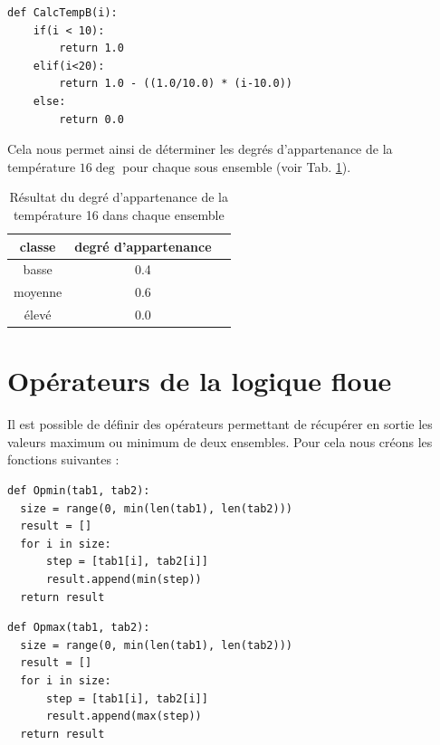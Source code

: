 \documentclass[a4paper,11pt]{article}
\begin{document}
\begin{lstlisting}[caption=Fonction de l'ensemble température basse]
  def CalcTempB(i):
    if(i < 10):
        return 1.0
    elif(i<20):
        return 1.0 - ((1.0/10.0) * (i-10.0))
    else:
        return 0.0
\end{lstlisting}

Cela nous permet ainsi de déterminer les degrés d'appartenance de la température $16\deg$ pour chaque sous 
ensemble (voir Tab. \ref{tab:temp16}).
\begin{table}[!h]
  \label{tab:temp16}
  \begin{center}
    \begin{tabular}{|c|c|c|}
      \hline
       classe & degré d'appartenance\\
       \hline
       basse & 0.4\\
       moyenne & 0.6\\
       élevé & 0.0\\
    \end{tabular}
    \caption{Résultat du degré d'appartenance de la température 16 dans chaque ensemble}
  \end{center}
\end{table}

\section{Opérateurs de la logique floue}
Il est possible de définir des opérateurs permettant de récupérer en sortie les valeurs maximum ou 
minimum de deux ensembles. Pour cela nous créons les fonctions suivantes :
\begin{lstlisting}[caption=Opérateur min]
 def Opmin(tab1, tab2):
  size = range(0, min(len(tab1), len(tab2)))
  result = []
  for i in size:
      step = [tab1[i], tab2[i]]
      result.append(min(step))
  return result
\end{lstlisting}

\begin{lstlisting}[caption=Opérateur max]
 def Opmax(tab1, tab2):
  size = range(0, min(len(tab1), len(tab2)))
  result = []
  for i in size:
      step = [tab1[i], tab2[i]]
      result.append(max(step))
  return result
\end{lstlisting}
\end{document}
